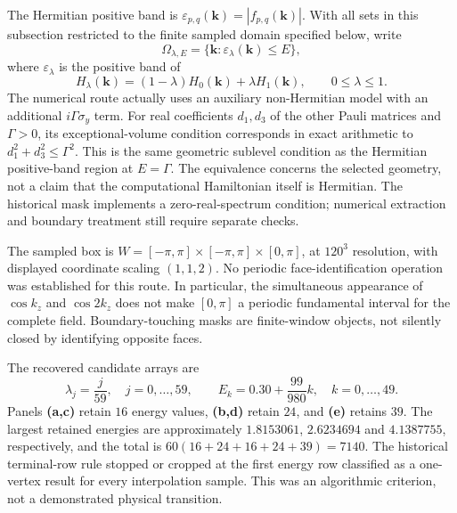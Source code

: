 \documentclass[10pt,twocolumn]{article}
\begin{document}
The Hermitian positive band is $\varepsilon_{p,q}(\mathbf k)=|f_{p,q}(\mathbf k)|$. With all sets in this subsection restricted to the finite sampled domain specified below, write
\begin{equation}
\Omega_{\lambda,E}=\{\mathbf k:\varepsilon_\lambda(\mathbf k)\leq E\},
\label{suppeq:fermi_volume_phase_map}
\end{equation}
where $\varepsilon_\lambda$ is the positive band of
\begin{equation}
H_\lambda(\mathbf k)=(1-\lambda)H_0(\mathbf k)+\lambda H_1(\mathbf k),\qquad 0\leq\lambda\leq1.
\label{suppeq:phase_map_interpolation}
\end{equation}
The numerical route actually uses an auxiliary non-Hermitian model with an additional $i\Gamma\sigma_y$ term. For real coefficients $d_1,d_3$ of the other Pauli matrices and $\Gamma>0$, its exceptional-volume condition corresponds in exact arithmetic to $d_1^2+d_3^2\leq\Gamma^2$. This is the same geometric sublevel condition as the Hermitian positive-band region at $E=\Gamma$. The equivalence concerns the selected geometry, not a claim that the computational Hamiltonian itself is Hermitian. The historical mask implements a zero-real-spectrum condition; numerical extraction and boundary treatment still require separate checks.

The sampled box is $W=[-\pi,\pi]\times[-\pi,\pi]\times[0,\pi]$, at $120^3$ resolution, with displayed coordinate scaling $(1,1,2)$. No periodic face-identification operation was established for this route. In particular, the simultaneous appearance of $\cos k_z$ and $\cos 2k_z$ does not make $[0,\pi]$ a periodic fundamental interval for the complete field. Boundary-touching masks are finite-window objects, not silently closed by identifying opposite faces.

The recovered candidate arrays are
\begin{equation}
\lambda_j=\frac{j}{59},\quad j=0,\ldots,59,
\qquad E_k=0.30+\frac{99}{980}k,\quad k=0,\ldots,49.
\label{suppeq:hamiltonian_sampling}
\end{equation}
Panels \textbf{(a,c)} retain $16$ energy values, \textbf{(b,d)} retain $24$, and \textbf{(e)} retains $39$. The largest retained energies are approximately $1.8153061$, $2.6234694$ and $4.1387755$, respectively, and the total is $60(16+24+16+24+39)=7140$. The historical terminal-row rule stopped or cropped at the first energy row classified as a one-vertex result for every interpolation sample. This was an algorithmic criterion, not a demonstrated physical transition.
\end{document}
